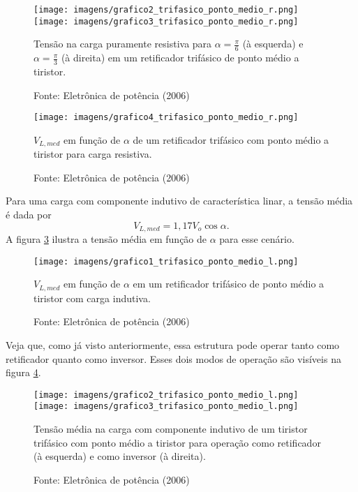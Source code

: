 \begin{figure}[h]
\center
\texttt{[image: imagens/grafico2\_trifasico\_ponto\_medio\_r.png]}
\texttt{[image: imagens/grafico3\_trifasico\_ponto\_medio\_r.png]}
\caption{Tensão na carga puramente resistiva para $\alpha = \frac{\pi}{6}$ (à esquerda) e $\alpha = \frac{\pi}{3}$ (à direita) em um retificador trifásico de ponto médio a tiristor.}\label{g2tm} 
\caption*{Fonte: Eletrônica de potência (2006)}
\end{figure}

\begin{figure}[h]
\center
\texttt{[image: imagens/grafico4\_trifasico\_ponto\_medio\_r.png]}
\caption{$V_{L,med}$ em função de $\alpha$ de um retificador trifásico com ponto médio a tiristor para carga resistiva.} \label{g4tm} 
\caption*{Fonte: Eletrônica de potência (2006)}
\end{figure}

Para uma carga com componente indutivo de característica linar, a tensão média é dada por \[
V_{L,med} = 1,17V_{o}\cos\alpha
.\]
A figura \ref{g1tml} ilustra a tensão média em função de $\alpha$ para esse cenário.

\begin{figure}[h]
\center
\texttt{[image: imagens/grafico1\_trifasico\_ponto\_medio\_l.png]}
\caption{$V_{L,med}$ em função de $\alpha$ em um retificador trifásico de ponto médio a tiristor com carga indutiva.} \label{g1tml} 
\caption*{Fonte: Eletrônica de potência (2006)}
\end{figure}

Veja que, como já visto anteriormente, essa estrutura pode operar tanto como retificador quanto como inversor. Esses dois modos de operação são visíveis na figura \ref{g2tml}.

\begin{figure}[h]
\center
\texttt{[image: imagens/grafico2\_trifasico\_ponto\_medio\_l.png]}
\texttt{[image: imagens/grafico3\_trifasico\_ponto\_medio\_l.png]}
\caption{Tensão média na carga com componente indutivo de um tiristor trifásico com ponto médio a tiristor para operação como retificador (à esquerda) e como inversor (à direita).} \label{g2tml} 
\caption*{Fonte: Eletrônica de potência (2006)}
\end{figure}

